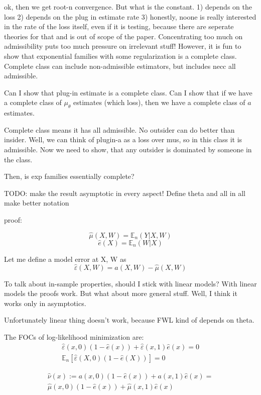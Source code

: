 \documentclass[a4paper,12pt]{article}
\theoremstyle{plain}
\begin{document}
ok, then we get root-n convergence. But what is the constant. 1) depends on the loss 2) depends on the plug in estimate rate 3) honestly, noone is really interested in the rate of the loss itself, even if it is testing, because there are seperate theories for that and is out of scope of the paper. Concentrating too much on admissibility puts too much pressure on irrelevant stuff! However, it is fun to show that exponential families with some regularization is a complete class. Complete class can include non-admissible estimators, but includes necc all admissible.

Can I show that plug-in estimate is a complete class. Can I show that if we have a complete class of $\mu_\theta$ estimates (which loss), then we have a complete class of $a$ estimates. 

Complete class means it has all admissible. No outsider can do better than insider. Well, we can think of plugin-a as a loss over mus, so in this class it is admissible. Now we need to show, that any outsider is dominated by someone in the class. 

Then, is exp families essentially complete?



TODO: make the result asymptotic in every aspect! Define theta and all in all make better notation

proof:

    $$\hat \mu(X, W) = \mathbb{E}_n(Y | X, W)$$
    $$\hat e(X) = \mathbb{E}_n(W | X)$$

    Let me define a model error at X, W as
    $$\hat \varepsilon(X, W) = a(X, W) - \hat\mu(X, W)$$


    To talk about in-sample properties, should I stick with linear models? With linear models the proofs work. But what about more general stuff. Well, I think it works only in asymptotics.  

    Unfortunately linear thing doesn't work, because FWL kind of depends on theta.

The FOCs of log-likelihood minimization are:
\begin{gather}
\hat \varepsilon(x, 0) (1 - \hat e(x)) + \hat \varepsilon(x, 1) \hat e(x) = 0 \label{foc1}\\
\mathbb{E}_n[\hat \varepsilon(X, 0) (1 - \hat e(X))] = 0 \label{foc2}
\end{gather}

\begin{gather*}
    \hat \nu(x) := a(x, 0) (1 - \hat e(x)) + a(x, 1) \hat e(x) = \\
    \hat \mu(x, 0) (1 - \hat e(x)) + \hat \mu(x, 1) \hat e(x)
\end{gather*}
\end{document}
